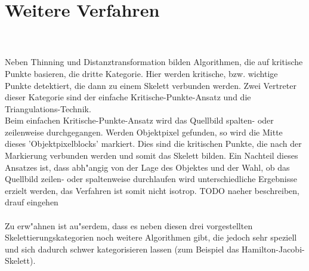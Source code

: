 \section{Weitere Verfahren}
\\ \\
Neben Thinning und Distanztransformation bilden Algorithmen, die auf kritische Punkte basieren, die dritte Kategorie. Hier werden kritische, bzw. wichtige Punkte detektiert, die dann zu einem Skelett verbunden werden. Zwei Vertreter dieser Kategorie sind der einfache Kritische-Punkte-Ansatz und die Triangulations-Technik. \\ 
Beim einfachen Kritische-Punkte-Ansatz wird das Quellbild spalten- oder zeilenweise durchgegangen. Werden Objektpixel gefunden, so wird die Mitte dieses 'Objektpixelblocks' markiert. Dies sind die kritischen Punkte, die nach der Markierung verbunden werden und somit das Skelett bilden. Ein Nachteil dieses Ansatzes ist, dass abh"angig von der Lage des Objektes und der Wahl, ob das Quellbild zeilen- oder spaltenweise durchlaufen wird unterschiedliche Ergebnisse erzielt werden, das Verfahren ist somit nicht isotrop.
TODO naeher beschreiben, drauf eingehen
\\ \\
Zu erw"ahnen ist au"serdem, dass es neben diesen drei vorgestellten Skelettierungskategorien noch weitere Algorithmen gibt, die jedoch sehr speziell und sich dadurch schwer kategorisieren lassen (zum Beispiel das Hamilton-Jacobi-Skelett).